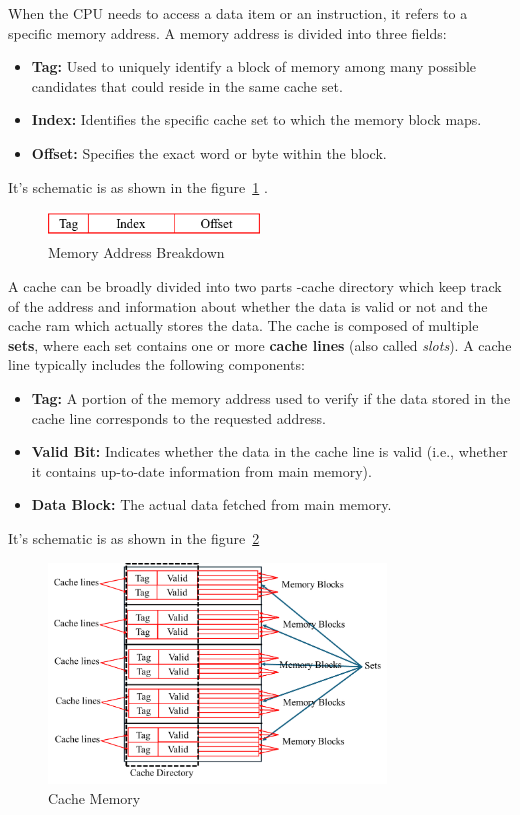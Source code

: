 \documentclass[12pt]{book}
\begin{document}
When the CPU needs to access a data item or an instruction, it refers to a specific memory address.
A memory address is divided into three fields:
\begin{itemize}
    \item \textbf{Tag:} Used to uniquely identify a block of memory among many possible candidates that could reside in the same cache set.
    \item \textbf{Index:} Identifies the specific cache set to which the memory block maps.
    \item \textbf{Offset:} Specifies the exact word or byte within the block.
\end{itemize}
It's schematic is as shown in the figure~\ref{fig:memory_address} .
\begin{figure}[H]
    \centering
    \includegraphics[width=0.5\textwidth]{images/memory_address.png}
    \caption{Memory Address Breakdown}
    \label{fig:memory_address}
\end{figure}
A cache can be broadly divided into two parts -cache directory which keep track of the address and information about whether the data is valid or not and the cache ram which actually stores the data. The cache is composed of multiple \textbf{sets}, where each set contains one or more \textbf{cache lines} (also called \textit{slots}). A cache line typically includes the following components:
\begin{itemize}
    \item \textbf{Tag:} A portion of the memory address used to verify if the data stored in the cache line corresponds to the requested address.
    \item \textbf{Valid Bit:} Indicates whether the data in the cache line is valid (i.e., whether it contains up-to-date information from main memory).
    \item \textbf{Data Block:} The actual data fetched from main memory.
\end{itemize}
It's schematic is as shown in the figure~\ref{fig:cache_memory}
\begin{figure}[H]
    \centering
    \includegraphics[width=0.8\textwidth]{images/cache_memory.png}
    \caption{Cache Memory}
    \label{fig:cache_memory}
\end{figure}
\end{document}

